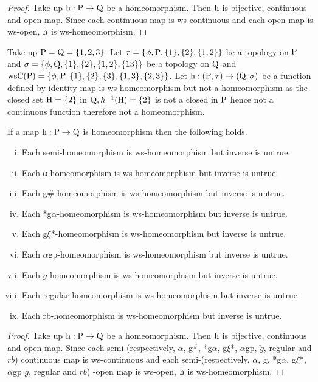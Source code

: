 \begin{proof}
Take up $\mathrm{h}: \mathrm{P}\to \mathrm{Q}$ be a homeomorphism. Then $\mathrm{h}$ is bijective, continuous and open map. Since each continuous map is ws-continuous and each open map is ws-open, $\mathrm{h}$ is ws-homeomorphism.
\end{proof}

\begin{exm}\label{exam5.2.4}
Take up $\mathrm{P}=\mathrm{Q}= \{1, 2, 3\}$. Let $\tau= \{\phi, \TSP, \{1\}, \{2\},\break \{1,2\}\}$ be a topology on $\mathrm{P}$  and $\sigma=\{\phi, \mathrm{Q}, \{1\}, \{2\}, \{1, 2\}, \{1 3\}\}$ be a topology on $\mathrm{Q}$ and $\mathrm{ws}\mathrm{C}(\mathrm{P})= \{\phi, \mathrm{P}, \{1\}, \{2\},\{3\}, \{1,3\},\{2, 3\}\}$. Let $\mathrm{h}: (\mathrm{P}, \tau )\to (\mathrm{Q}, \sigma)$ be a function defined by identity map is ws-homeomorphism but not a homeomorphism as the closed set $\mathrm{H}=\{2\}$ in $\mathrm{Q}, h^{-1} (\mathrm{H})=\{2\}$ is not a closed in $\mathrm{P}$ hence not a continuous function therefore not a homeomorphism.
\end{exm}

\begin{thm}\label{thm5.2.5}
If a map $\mathrm{h}: \mathrm{P}\to \mathrm{Q}$ is homeomorphism then the following holds.
\begin{enumerate}[(i)]
\item Each semi-homeomorphism is ws-homeomorphism but inverse is untrue.
\item Each α-homeomorphism is ws-homeomorphism but inverse is untrue.
\item Each g\#-homeomorphism is ws-homeomorphism but inverse is untrue.
\item Each *g$\alpha$-homeomorphism is ws-homeomorphism but inverse is untrue.
\item Each g$\xi$*-homeomorphism is ws-homeomorphism but inverse is untrue.
\item Each $\alpha$gp-homeomorphism is ws-homeomorphism but inverse is untrue.
\item Each $\ddot{g}$-homeomorphism is ws-homeomorphism but inverse is untrue.
\item Each regular-homeomorphism is ws-homeomorphism but inverse is untrue
\item Each rb-homeomorphism is ws-homeomorphism but inverse is untrue.
\end{enumerate}
\end{thm}

\begin{proof}
Take up $\mathrm{h}: \mathrm{P}\to \mathrm{Q}$ be a homeomorphism. Then $\mathrm{h}$ is bijective, continuous and open map. Since each semi (respectively, $\alpha$, g$^{\text{\#}}$, *g$\alpha$, g$\xi$*, $\alpha$gp, $\ddot{g}$, regular and $rb$) continuous map is ws-continuous and each semi-(respectively, $\alpha$, g, *g$\alpha$, g$\xi$*, $\alpha$gp $\ddot{g}$, regular and $rb$) -open map is ws-open, $\mathrm{h}$ is ws-homeomorphism.
\end{proof}

